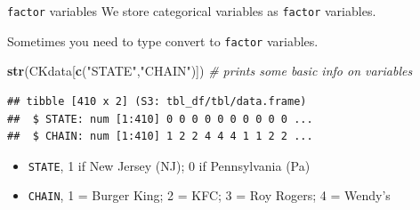 \documentclass[
  ignorenonframetext,
]{beamer}
\newenvironment{Shaded}{\begin{snugshade}}{\end{snugshade}}
\newcommand{\CommentTok}[1]{\textcolor[rgb]{0.56,0.35,0.01}{\textit{#1}}}
\newcommand{\FunctionTok}[1]{\textcolor[rgb]{0.13,0.29,0.53}{\textbf{#1}}}
\newcommand{\NormalTok}[1]{#1}
\newcommand{\StringTok}[1]{\textcolor[rgb]{0.31,0.60,0.02}{#1}}
\providecommand{\tightlist}{%
  \setlength{\itemsep}{0pt}\setlength{\parskip}{0pt}}
\begin{document}
\begin{frame}[fragile]{\texttt{factor} variables}
\label{variables}
We store categorical variables as \texttt{factor} variables.

Sometimes you need to type convert to \texttt{factor} variables.

\begin{Shaded}
\begin{Highlighting}[]
\FunctionTok{str}\NormalTok{(CKdata[}\FunctionTok{c}\NormalTok{(}\StringTok{"STATE"}\NormalTok{,}\StringTok{"CHAIN"}\NormalTok{)])  }\CommentTok{\# prints some basic info on variables}
\end{Highlighting}
\end{Shaded}

\begin{verbatim}
## tibble [410 x 2] (S3: tbl_df/tbl/data.frame)
##  $ STATE: num [1:410] 0 0 0 0 0 0 0 0 0 0 ...
##  $ CHAIN: num [1:410] 1 2 2 4 4 4 1 1 2 2 ...
\end{verbatim}

\begin{itemize}
\tightlist
\item
  \texttt{STATE}, 1 if New Jersey (NJ); 0 if Pennsylvania (Pa)
\item
  \texttt{CHAIN}, 1 = Burger King; 2 = KFC; 3 = Roy Rogers; 4 = Wendy's
\end{itemize}
\end{frame}
\end{document}
